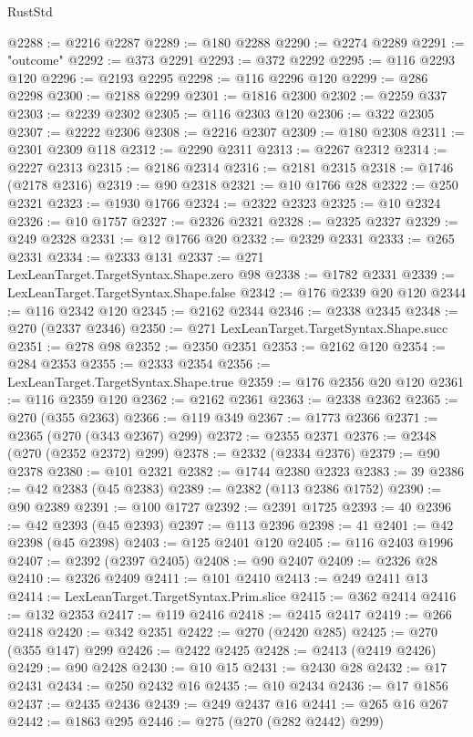 \begin{lexlean}{RustStd}
\begin{coremodule}
@2288 := @2216 @2287
@2289 := @180 @2288
@2290 := @2274 @2289
@2291 := "outcome"
@2292 := @373 @2291
@2293 := @372 @2292
@2295 := @116 @2293 @120
@2296 := @2193 @2295
@2298 := @116 @2296 @120
@2299 := @286 @2298
@2300 := @2188 @2299
@2301 := @1816 @2300
@2302 := @2259 @337
@2303 := @2239 @2302
@2305 := @116 @2303 @120
@2306 := @322 @2305
@2307 := @2222 @2306
@2308 := @2216 @2307
@2309 := @180 @2308
@2311 := @2301 @2309 @118
@2312 := @2290 @2311
@2313 := @2267 @2312
@2314 := @2227 @2313
@2315 := @2186 @2314
@2316 := @2181 @2315
@2318 := @1746 (@2178 @2316)
@2319 := @90 @2318
@2321 := @10 @1766 @28
@2322 := @250 @2321
@2323 := @1930 @1766
@2324 := @2322 @2323
@2325 := @10 @2324
@2326 := @10 @1757
@2327 := @2326 @2321
@2328 := @2325 @2327
@2329 := @249 @2328
@2331 := @12 @1766 @20
@2332 := @2329 @2331
@2333 := @265 @2331
@2334 := @2333 @131
@2337 := @271 LexLeanTarget.TargetSyntax.Shape.zero @98
@2338 := @1782 @2331
@2339 := LexLeanTarget.TargetSyntax.Shape.false
@2342 := @176 @2339 @20 @120
@2344 := @116 @2342 @120
@2345 := @2162 @2344
@2346 := @2338 @2345
@2348 := @270 (@2337 @2346)
@2350 := @271 LexLeanTarget.TargetSyntax.Shape.succ
@2351 := @278 @98
@2352 := @2350 @2351
@2353 := @2162 @120
@2354 := @284 @2353
@2355 := @2333 @2354
@2356 := LexLeanTarget.TargetSyntax.Shape.true
@2359 := @176 @2356 @20 @120
@2361 := @116 @2359 @120
@2362 := @2162 @2361
@2363 := @2338 @2362
@2365 := @270 (@355 @2363)
@2366 := @119 @349
@2367 := @1773 @2366
@2371 := @2365 (@270 (@343 @2367) @299)
@2372 := @2355 @2371
@2376 := @2348 (@270 (@2352 @2372) @299)
@2378 := @2332 (@2334 @2376)
@2379 := @90 @2378
@2380 := @101 @2321
@2382 := @1744 @2380 @2323
@2383 := 39
@2386 := @42 @2383 (@45 @2383)
@2389 := @2382 (@113 @2386 @1752)
@2390 := @90 @2389
@2391 := @100 @1727
@2392 := @2391 @1725
@2393 := 40
@2396 := @42 @2393 (@45 @2393)
@2397 := @113 @2396
@2398 := 41
@2401 := @42 @2398 (@45 @2398)
@2403 := @125 @2401 @120
@2405 := @116 @2403 @1996
@2407 := @2392 (@2397 @2405)
@2408 := @90 @2407
@2409 := @2326 @28
@2410 := @2326 @2409
@2411 := @101 @2410
@2413 := @249 @2411 @13
@2414 := LexLeanTarget.TargetSyntax.Prim.slice
@2415 := @362 @2414
@2416 := @132 @2353
@2417 := @119 @2416
@2418 := @2415 @2417
@2419 := @266 @2418
@2420 := @342 @2351
@2422 := @270 (@2420 @285)
@2425 := @270 (@355 @147) @299
@2426 := @2422 @2425
@2428 := @2413 (@2419 @2426)
@2429 := @90 @2428
@2430 := @10 @15
@2431 := @2430 @28
@2432 := @17 @2431
@2434 := @250 @2432 @16
@2435 := @10 @2434
@2436 := @17 @1856
@2437 := @2435 @2436
@2439 := @249 @2437 @16
@2441 := @265 @16 @267
@2442 := @1863 @295
@2446 := @275 (@270 (@282 @2442) @299)

\end{coremodule}
\end{lexlean}
